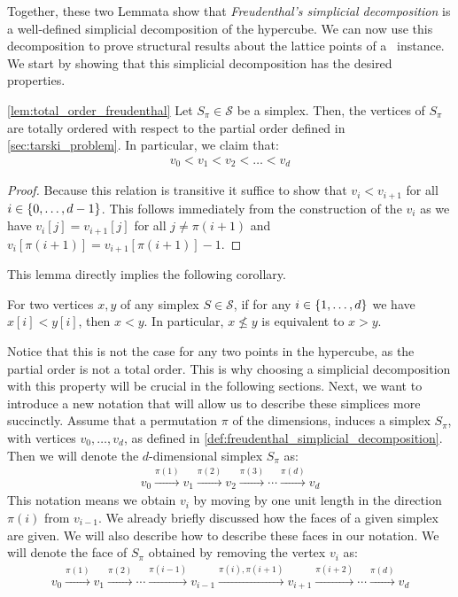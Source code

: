 Together, these two Lemmata show that \textit{Freudenthal's simplicial decomposition} is a well-defined simplicial decomposition of the hypercube. We can now use this decomposition to prove structural results about the lattice points of a \Tarski\ instance. We start by showing that this simplicial decomposition has the desired properties.
\begin{lemma}
    \cref{lem:total_order_freudenthal}
	Let $S_{\pi} \in \mathcal{S}$ be a simplex. Then, the vertices of $S_{\pi}$ are totally ordered with respect to the partial order defined in \cref{sec:tarski_problem}. In particular, we claim that:
	\begin{align*}
		v_0 < v_1 < v_2 < \dots < v_d
	\end{align*}
\end{lemma}
\begin{proof}
	Because this relation is transitive it suffice to show that $v_i < v_{i+1}$ for all $i \in \left\{0, \dots, d-1\right\}$. This follows immediately from the construction of the $v_i$ as we have $v_i[j] = v_{i+1}[j]$ for all $j \neq \pi(i+1)$ and $v_i[\pi(i+1)] = v_{i+1}[\pi(i+1)] - 1$.
\end{proof}
This lemma directly implies the following corollary.
\begin{corollary}
	\label{cor:total_ordering}
	For two vertices $x,y$ of any simplex $S \in \mathcal{S}$, if for any $i \in \left\{1, \dots, d\right\}$ we have $x[i] < y[i]$, then $x < y$. In particular, $x \not\leq y$ is equivalent to $x > y$.
\end{corollary}
Notice that this is not the case for any two points in the hypercube, as the partial order is not a total order. This is why choosing a simplicial decomposition with this property will be crucial in the following sections. Next, we want to introduce a new notation that will allow us to describe these simplices more succinctly. Assume that a permutation $\pi$ of the dimensions, induces a simplex $S_{\pi}$, with vertices $v_0, \dots, v_d$, as defined in \cref{def:freudenthal_simplicial_decomposition}. Then we will denote the $d$-dimensional simplex $S_{\pi}$ as:
\begin{align*}
	v_0 \xrightarrow{\pi(1)} v_1 \xrightarrow{\pi(2)} v_2 \xrightarrow{\pi(3)} \cdots \xrightarrow{\pi(d)} v_d
\end{align*}
This notation means we obtain $v_i$ by moving by one unit length in the direction $\pi(i)$ from $v_{i-1}$. We already briefly discussed how the faces of a given simplex are given. We will also describe how to describe these faces in our notation. We will denote the face of $S_{\pi}$ obtained by removing the vertex $v_i$ as:
\begin{align*}
	v_0 \xrightarrow{\pi(1)} v_1 \xrightarrow{\pi(2)} \cdots \xrightarrow{\pi(i - 1)} v_{i-1} \xrightarrow{\pi(i), \pi(i+1)} v_{i+1} \xrightarrow{\pi(i+2)} \cdots \xrightarrow{\pi(d)} v_d
\end{align*}

